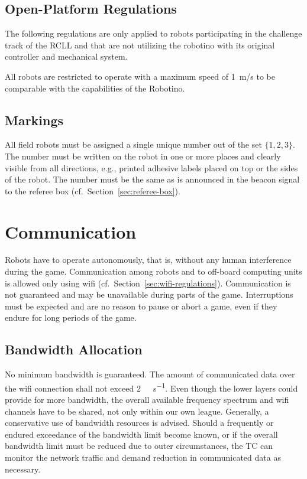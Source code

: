 \documentclass[12pt,twoside]{article}
\newcommand{\refsec}[1]{Section~\ref{#1}}
\begin{document}
\subsection{Open-Platform Regulations}
The following regulations are only applied to robots participating in the
challenge track of the \ac{RCLL} and that are not utilizing the robotino with
its original controller and mechanical system.

All robots are restricted to
operate with a maximum speed of \SI[fraction-function=\dfrac]{1}{\metre/\second}
to be comparable with the capabilities of the Robotino.

\subsection{Markings}
\label{sec:robot-markings}
All field robots must be assigned a single unique number out of the
set $\{1, 2, 3\}$. The number must be written on the robot in one or
more places and clearly visible from all directions, e.g., printed
adhesive labels placed on top or the sides of the robot. The number
must be the same as is announced in the beacon signal to the referee
box (cf.~\refsec{sec:referee-box}).

\section{Communication}
\label{sec:communication}

Robots have to operate autonomously, that is, without any human
interference during the game. Communication among robots and to
off-board computing units is allowed only using wifi
(cf.~\refsec{sec:wifi-regulations}). Communication is not guaranteed
and may be unavailable during parts of the game. Interruptions must be
expected and are no reason to pause or abort a game, even if they
endure for long periods of the game.

\subsection{Bandwidth Allocation}
\label{sec:bandwidth}
No minimum bandwidth is guaranteed. The amount of communicated data
over the wifi connection shall not exceed
\SI[per-mode=symbol]{2}{\mega\bit\per\second}. Even though the lower
layers could provide for more bandwidth, the overall available
frequency spectrum and wifi channels have to be shared, not only
within our own league. Generally, a conservative use of bandwidth
resources is advised. Should a frequently or endured exceedance of the
bandwidth limit become known, or if the overall bandwidth limit must
be reduced due to outer circumstances, the \ac{TC} can monitor the network
traffic and demand reduction in communicated data as necessary.
\end{document}
